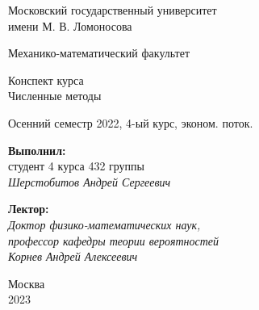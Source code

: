 \documentclass{article}
\theoremstyle{definition}
\theoremstyle{remark}
\begin{document}
\begin{titlepage}

  \begin{center}
    Московский государственный университет\\
    имени М. В. Ломоносова\\

    \vspace{0.25 cm}

    \normalsize{Механико-математический факультет\\}
  \end{center}

  \vspace{6cm}

  \begin{center}
    \LARGE{Конспект курса\\ Численные методы} \\

    \vspace{0.5 cm}

    \normalsize{}
    Осенний семестр 2022, 4-ый курс, эконом. поток.
  \end{center}

  \vspace{3 cm}

  \begin{flushright}
    \textbf{Выполнил:}\\
    студент 4 курса
    432 группы\\

    \textit{Шерстобитов Андрей Сергеевич}\\

    \vspace{1 cm}

    \textbf{Лектор:}\\

    \textit{Доктор физико-математических наук,\\ профессор кафедры теории вероятностей} \\
    \textit{Корнев Андрей Алексеевич}
  \end{flushright}

  \vspace{\fill}
  \normalsize{}
  \begin{center}
    Москва\\2023
  \end{center}

  \thispagestyle{empty}
\end{titlepage}
\end{document}
